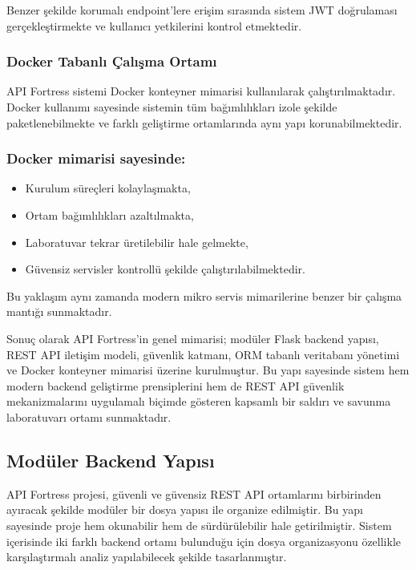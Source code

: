 Benzer şekilde korumalı endpoint’lere erişim sırasında sistem JWT doğrulaması gerçekleştirmekte ve kullanıcı yetkilerini kontrol etmektedir.

\subsubsection{Docker Tabanlı Çalışma Ortamı}

API Fortress sistemi Docker konteyner mimarisi kullanılarak çalıştırılmaktadır. Docker kullanımı sayesinde sistemin tüm bağımlılıkları izole şekilde paketlenebilmekte ve farklı geliştirme ortamlarında aynı yapı korunabilmektedir.

\subsubsection{Docker mimarisi sayesinde:}

\begin{itemize}[leftmargin=*]
    \item Kurulum süreçleri kolaylaşmakta,
    \item Ortam bağımlılıkları azaltılmakta,
    \item Laboratuvar tekrar üretilebilir hale gelmekte,
    \item Güvensiz servisler kontrollü şekilde çalıştırılabilmektedir.
\end{itemize}

Bu yaklaşım aynı zamanda modern mikro servis mimarilerine benzer bir çalışma mantığı sunmaktadır.

Sonuç olarak API Fortress’in genel mimarisi; modüler Flask backend yapısı, REST API iletişim modeli, güvenlik katmanı, ORM tabanlı veritabanı yönetimi ve Docker konteyner mimarisi üzerine kurulmuştur. Bu yapı sayesinde sistem hem modern backend geliştirme prensiplerini hem de REST API güvenlik mekanizmalarını uygulamalı biçimde gösteren kapsamlı bir saldırı ve savunma laboratuvarı ortamı sunmaktadır.

\subsection{Modüler Backend Yapısı}
\label{mod-ler-backend-yap-s}

API Fortress projesi, güvenli ve güvensiz REST API ortamlarını birbirinden ayıracak şekilde modüler bir dosya yapısı ile organize edilmiştir. Bu yapı sayesinde proje hem okunabilir hem de sürdürülebilir hale getirilmiştir. Sistem içerisinde iki farklı backend ortamı bulunduğu için dosya organizasyonu özellikle karşılaştırmalı analiz yapılabilecek şekilde tasarlanmıştır.

